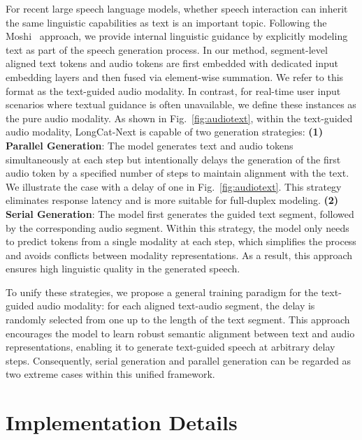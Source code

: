 \documentclass{article}
\begin{document}
For recent large speech language models, whether speech interaction can inherit the same linguistic capabilities as text is an important topic.
Following the Moshi~\cite{defossez2024moshi} approach, we provide internal linguistic guidance by explicitly modeling text as part of the speech generation process. In our method, segment-level aligned text tokens and audio tokens are first embedded with dedicated input embedding layers and then fused via element-wise summation. We refer to this format as the text-guided audio modality. In contrast, for real-time user input scenarios where textual guidance is often unavailable, we define these instances as the pure audio modality. 
As shown in Fig.~\ref{fig:audiotext}, within the text-guided audio modality, LongCat-Next is capable of two generation strategies:
\textbf{(1) Parallel Generation}: The model generates text and audio tokens simultaneously at each step but intentionally delays the generation of the first audio token by a specified number of steps to maintain alignment with the text. We illustrate the case with a delay of one in Fig.~\ref{fig:audiotext}.
This strategy eliminates response latency and is more suitable for full-duplex modeling. \textbf{(2) Serial Generation}: The model first generates the guided text segment, followed by the corresponding audio segment. Within this strategy, the model only needs to predict tokens from a single modality at each step, which simplifies the process and avoids conflicts between modality representations. As a result, this approach ensures high linguistic quality in the generated speech.

To unify these strategies, we propose a general training paradigm for the text-guided audio modality: for each aligned text-audio segment, the delay is randomly selected from one up to the length of the text segment. This approach encourages the model to learn robust semantic alignment between text and audio representations, enabling it to generate text-guided speech at arbitrary delay steps. Consequently, serial generation and parallel generation can be regarded as two extreme cases within this unified framework.












\section{Implementation Details}
\label{sec:implementation_details}
\end{document}
